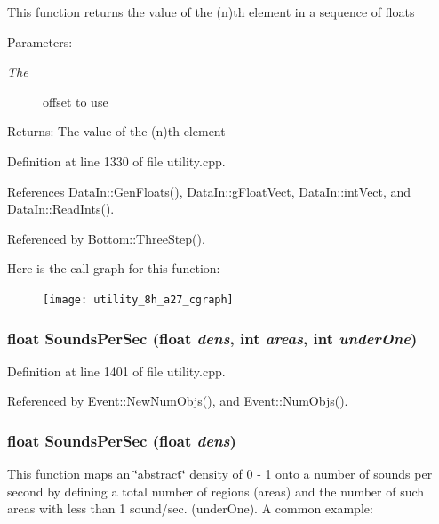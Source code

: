 This function returns the value of the (n)th element in a sequence of floats \begin{Desc}
\item[Parameters:]
\begin{description}
\item[{\em The}]offset to use \end{description}
\end{Desc}
\begin{Desc}
\item[Returns:]The value of the (n)th element \end{Desc}


Definition at line 1330 of file utility.cpp.

References Data\-In::Gen\-Floats(), Data\-In::g\-Float\-Vect, Data\-In::int\-Vect, and Data\-In::Read\-Ints().

Referenced by Bottom::Three\-Step().

Here is the call graph for this function:\begin{figure}[H]
\begin{center}
\leavevmode
\texttt{[image: utility\_8h\_a27\_cgraph]}
\end{center}
\end{figure}
\subsubsection{\setlength{\rightskip}{0pt plus 5cm}float Sounds\-Per\-Sec (float {\em dens}, int {\em areas}, int {\em under\-One})}\label{utility_8h_a30}




Definition at line 1401 of file utility.cpp.

Referenced by Event::New\-Num\-Objs(), and Event::Num\-Objs().
\subsubsection{\setlength{\rightskip}{0pt plus 5cm}float Sounds\-Per\-Sec (float {\em dens})}\label{utility_8h_a29}


This function maps an \char`\"{}abstract\char`\"{} density of 0 - 1 onto a number of sounds per second by defining a total number of regions (areas) and the number of such areas with less than 1 sound/sec. (under\-One). A common example:

